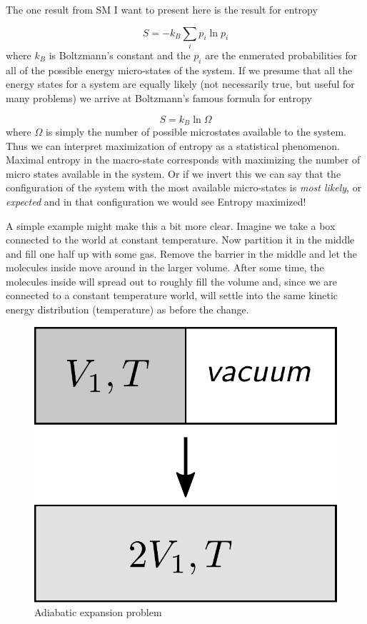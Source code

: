 \documentclass[twocolumn]{memoir} %
\begin{document}
The one result from SM I want to present here is the result for entropy

\begin{equation}
    S = -k_B \sum_i p_i \ln p_i
    \label{eq:entropy_sm}
\end{equation}
%
where $k_{B}$ is Boltzmann's constant and the $p_i$ are the enmerated probabilities for
all of the possible energy micro-states of the system.  If we presume that all the
energy states for a system are equally likely (not necessarily true, but useful for
many problems) we arrive at Boltzmann's famous formula for entropy

\begin{equation}
    S = k_B \ln \Omega
\end{equation}
%
where $\Omega$ is simply the number of possible microstates available to the system.  Thus we
can interpret maximization of entropy as a statistical phenomenon.  Maximal entropy in the
macro-state corresponds with maximizing the number of micro states available in the
system.  Or if we invert this we can say that the configuration of the system with the most
available micro-states is \emph{most likely}, or \emph{expected} and in that configuration
we would see Entropy maximized!

A simple example might make this a bit more clear.  Imagine we take a box connected to
the world at constant temperature.  Now partition it in the
middle and fill one half up with some gas.  Remove the barrier in the middle and let the 
molecules inside move around in the larger volume.  After some time, the molecules inside
will spread out to roughly fill the volume and, since we are connected to a constant temperature
world, will settle into the same kinetic energy distribution (temperature) as before the
change.

\begin{figure}[H]
    \includegraphics[width=0.7\columnwidth]{expansion}
    \caption{Adiabatic expansion problem}
\end{figure}
\end{document}
